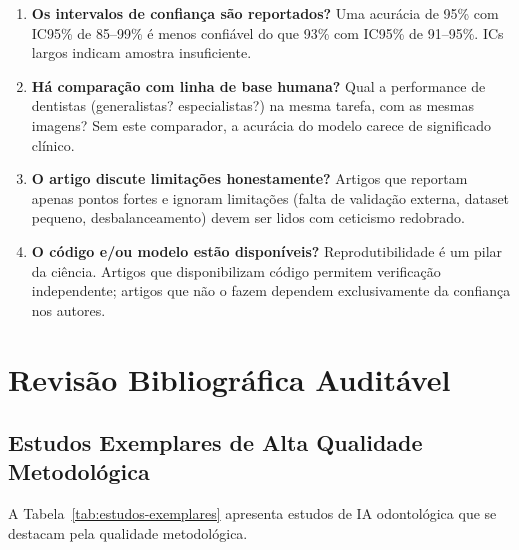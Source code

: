 \begin{enumerate}
    \item \textbf{Os intervalos de confiança são reportados?} Uma acurácia de 95\% com IC95\% de 85--99\% é menos confiável do que 93\% com IC95\% de 91--95\%. ICs largos indicam amostra insuficiente.
    
    \item \textbf{Há comparação com linha de base humana?} Qual a performance de dentistas (generalistas? especialistas?) na mesma tarefa, com as mesmas imagens? Sem este comparador, a acurácia do modelo carece de significado clínico.
    
    \item \textbf{O artigo discute limitações honestamente?} Artigos que reportam apenas pontos fortes e ignoram limitações (falta de validação externa, dataset pequeno, desbalanceamento) devem ser lidos com ceticismo redobrado.
    
    \item \textbf{O código e/ou modelo estão disponíveis?} Reprodutibilidade é um pilar da ciência. Artigos que disponibilizam código permitem verificação independente; artigos que não o fazem dependem exclusivamente da confiança nos autores.
\end{enumerate}

\section{Revisão Bibliográfica Auditável}

\subsection{Estudos Exemplares de Alta Qualidade Metodológica}

A Tabela~\ref{tab:estudos-exemplares} apresenta estudos de IA odontológica que se destacam pela qualidade metodológica.


